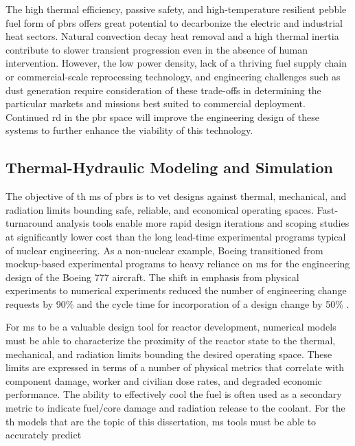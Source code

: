 The high thermal efficiency, passive safety, and high-temperature resilient pebble fuel form of \glspl{pbr} offers great potential to decarbonize the electric and industrial heat sectors. Natural convection decay heat removal and a high thermal inertia contribute to slower transient progression even in the absence of human intervention. However, the low power density, lack of a thriving fuel supply chain or commercial-scale reprocessing technology, and engineering challenges such as dust generation require consideration of these trade-offs in determining the particular markets and missions best suited to commercial deployment. Continued \gls{rd} in the \gls{pbr} space will improve the engineering design of these systems to further enhance the viability of this technology.


\subsection{Thermal-Hydraulic Modeling and Simulation}
\label{sec:ph_motivation}

The objective of \gls{th} \gls{ms} of \glspl{pbr} is to vet designs against thermal, mechanical, and radiation limits bounding safe, reliable, and economical operating spaces. Fast-turnaround analysis tools enable more rapid design iterations and scoping studies at significantly lower cost than the long lead-time experimental programs typical of nuclear engineering. As a non-nuclear example, Boeing transitioned from mockup-based experimental programs to heavy reliance on \gls{ms} for the engineering design of the Boeing 777 aircraft. The shift in emphasis from physical experiments to numerical experiments reduced the number of engineering change requests by 90\% and the cycle time for incorporation of a design change by 50\% \cite{boeing}.

For \gls{ms} to be a valuable design tool for reactor development, numerical models must be able to characterize the proximity of the reactor state to the thermal, mechanical, and radiation limits bounding the desired operating space. These limits are expressed in terms of a number of physical metrics that correlate with component damage, worker and civilian dose rates, and degraded economic performance. The ability to effectively cool the fuel is often used as a secondary metric to indicate fuel/core damage and radiation release to the coolant. For the \gls{th} models that are the topic of this dissertation, \gls{ms} tools must be able to accurately predict

